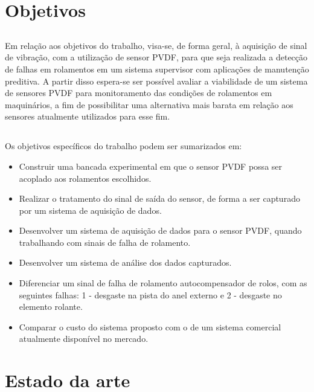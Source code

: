 \documentclass[
	12pt,				
	oneside,			
	a4paper,			
	english,			
	brazil,	
	sumario=abnt-6027-2012		
	]{abntex2ppgsi}
\begin{document}
\chapter{Objetivos}

\section{}

Em relação aos objetivos do trabalho, visa-se, de forma geral, à aquisição de sinal de vibração, com a utilização de sensor PVDF, para que seja realizada a detecção de falhas em rolamentos em um sistema supervisor com aplicações de manutenção preditiva. A partir disso espera-se ser possível avaliar a viabilidade de um sistema de sensores PVDF para monitoramento das condições de rolamentos em maquinários, a fim de possibilitar uma alternativa mais barata em relação aos sensores atualmente utilizados para esse fim.

\section{}

Os objetivos específicos do trabalho podem ser sumarizados em:

\begin{itemize}
	\item Construir uma bancada experimental em que o sensor PVDF possa ser acoplado aos rolamentos escolhidos.
	\item Realizar o tratamento do sinal de saída do sensor, de forma a ser capturado por um sistema de aquisição de dados.
	\item Desenvolver um sistema de aquisição de dados para o sensor PVDF, quando trabalhando com sinais de falha de rolamento.
	\item Desenvolver um sistema de análise dos dados capturados.
	\item Diferenciar um sinal de falha de rolamento autocompensador de rolos, com as seguintes falhas: 1 - desgaste na pista do anel externo e 2 - desgaste no elemento rolante.
	\item Comparar o custo do sistema proposto com o de um sistema comercial atualmente disponível no mercado.
\end{itemize}

\newpage
\chapter{\textbf{Estado da arte}}
\end{document}
